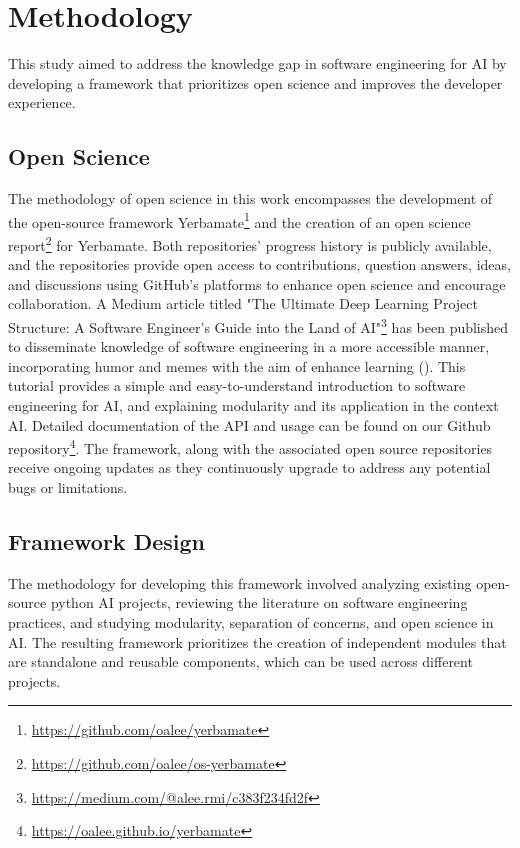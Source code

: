 


\section{Methodology}


This study aimed to address the knowledge gap in software engineering for AI by developing a framework that prioritizes open science and improves the developer experience. 

\subsection{Open Science}

The methodology of open science in this work encompasses the development of the open-source framework Yerbamate\footnote{\url{https://github.com/oalee/yerbamate}} and the creation of an open science report\footnote{ \url{https://github.com/oalee/os-yerbamate}} for Yerbamate. Both repositories' progress history is publicly available, and the repositories provide open access to contributions, question answers, ideas, and discussions using GitHub's platforms to enhance open science and encourage collaboration. A Medium article titled "The Ultimate Deep Learning Project Structure: A Software Engineer’s Guide into the Land of AI"\footnote{\url{https://medium.com/@alee.rmi/c383f234fd2f}} has been published to disseminate knowledge of software engineering in a more accessible manner, incorporating humor and memes with the aim of enhance learning (\cite{powell1985humour}). This tutorial provides a simple and easy-to-understand introduction to software engineering for AI, and explaining modularity and its application in the context AI. Detailed documentation of the API and usage can be found on our Github repository\footnote{\url{https://oalee.github.io/yerbamate}}. The framework, along with the associated open source repositories receive ongoing updates as they continuously upgrade to address any potential bugs or limitations.

\subsection{Framework Design}

The methodology for developing this framework involved analyzing existing open-source python AI projects, reviewing the literature on software engineering practices, and studying modularity, separation of concerns, and open science in AI. The resulting framework prioritizes the creation of independent modules that are standalone and reusable components, which can be used across different projects.

